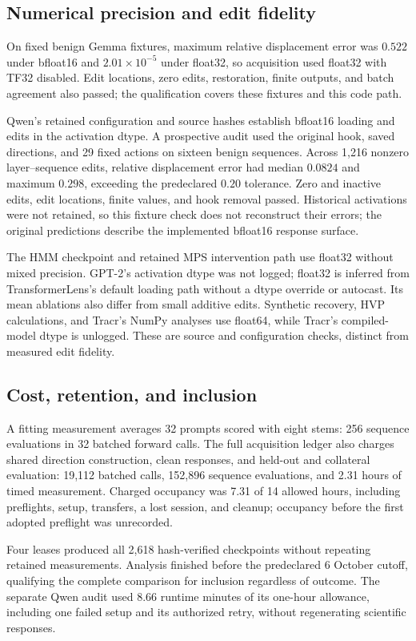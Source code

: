 \subsection{Numerical precision and edit fidelity}\label{app:precision}

On fixed benign Gemma fixtures, maximum relative displacement error was $0.522$ under bfloat16 and $2.01\times10^{-5}$ under float32, so acquisition used float32 with TF32 disabled. Edit locations, zero edits, restoration, finite outputs, and batch agreement also passed; the qualification covers these fixtures and this code path.

Qwen's retained configuration and source hashes establish bfloat16 loading and edits in the activation dtype. A prospective audit used the original hook, saved directions, and 29 fixed actions on sixteen benign sequences. Across 1,216 nonzero layer--sequence edits, relative displacement error had median $0.0824$ and maximum $0.298$, exceeding the predeclared $0.20$ tolerance. Zero and inactive edits, edit locations, finite values, and hook removal passed. Historical activations were not retained, so this fixture check does not reconstruct their errors; the original predictions describe the implemented bfloat16 response surface.

The HMM checkpoint and retained MPS intervention path use float32 without mixed precision. GPT-2's activation dtype was not logged; float32 is inferred from TransformerLens's default loading path without a dtype override or autocast. Its mean ablations also differ from small additive edits. Synthetic recovery, HVP calculations, and Tracr's NumPy analyses use float64, while Tracr's compiled-model dtype is unlogged. These are source and configuration checks, distinct from measured edit fidelity.

\subsection{Cost, retention, and inclusion}

A fitting measurement averages 32 prompts scored with eight stems: 256 sequence evaluations in 32 batched forward calls. The full acquisition ledger also charges shared direction construction, clean responses, and held-out and collateral evaluation: 19,112 batched calls, 152,896 sequence evaluations, and 2.31 hours of timed measurement. Charged occupancy was 7.31 of 14 allowed hours, including preflights, setup, transfers, a lost session, and cleanup; occupancy before the first adopted preflight was unrecorded.

Four leases produced all 2,618 hash-verified checkpoints without repeating retained measurements. Analysis finished before the predeclared 6 October cutoff, qualifying the complete comparison for inclusion regardless of outcome. The separate Qwen audit used $8.66$ runtime minutes of its one-hour allowance, including one failed setup and its authorized retry, without regenerating scientific responses.
